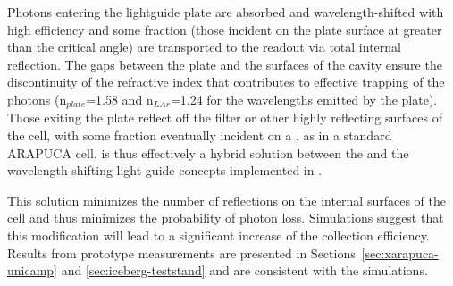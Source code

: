 Photons entering the lightguide plate are absorbed and wavelength-shifted with high efficiency and some fraction (those incident on the plate surface at greater than the critical angle) are transported to the readout via total internal reflection. The  gaps between the plate and the surfaces of the cavity ensure the discontinuity of the refractive index that contributes to effective trapping of the photons (n$_{plate}$=1.58 and n$_{LAr}$=1.24 for the wavelengths emitted by the plate).
Those exiting the plate reflect off the filter or other highly reflecting surfaces of the cell, with some fraction eventually incident on a , as in a standard ARAPUCA cell.
 is thus effectively a hybrid solution between the  and the wavelength-shifting light guide concepts implemented in .



This solution minimizes the number of reflections on the internal surfaces of the cell and thus minimizes the probability of photon loss. Simulations suggest that this modification will lead to a significant increase of the collection efficiency. 
Results from prototype measurements are presented in Sections~\ref{sec:xarapuca-unicamp} and \ref{sec:iceberg-teststand} and are consistent with the simulations.


